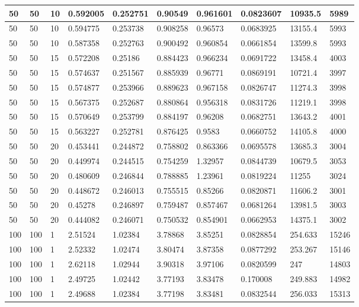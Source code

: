 \begin{landscape}
\begin{longtable}{ | l | l | l | l | l | l | l | l | l | l | }
50 & 50 & 10 & 0.592005 & 0.252751 & 0.90549 & 0.961601 & 0.0823607 & 10935.5 & 5989\\ \hline
50 & 50 & 10 & 0.594775 & 0.253738 & 0.908258 & 0.96573 & 0.0683925 & 13155.4 & 5993\\ \hline
50 & 50 & 10 & 0.587358 & 0.252763 & 0.900492 & 0.960854 & 0.0661854 & 13599.8 & 5993\\ \hline
50 & 50 & 15 & 0.572208 & 0.25186 & 0.884423 & 0.966234 & 0.0691722 & 13458.4 & 4003\\ \hline
50 & 50 & 15 & 0.574637 & 0.251567 & 0.885939 & 0.96771 & 0.0869191 & 10721.4 & 3997\\ \hline
50 & 50 & 15 & 0.574877 & 0.253966 & 0.889623 & 0.967158 & 0.0826747 & 11274.3 & 3998\\ \hline
50 & 50 & 15 & 0.567375 & 0.252687 & 0.880864 & 0.956318 & 0.0831726 & 11219.1 & 3998\\ \hline
50 & 50 & 15 & 0.570649 & 0.253799 & 0.884197 & 0.96208 & 0.0682751 & 13643.2 & 4001\\ \hline
50 & 50 & 15 & 0.563227 & 0.252781 & 0.876425 & 0.9583 & 0.0660752 & 14105.8 & 4000\\ \hline
50 & 50 & 20 & 0.453441 & 0.244872 & 0.758802 & 0.863366 & 0.0695578 & 13685.3 & 3004\\ \hline
50 & 50 & 20 & 0.449974 & 0.244515 & 0.754259 & 1.32957 & 0.0844739 & 10679.5 & 3053\\ \hline
50 & 50 & 20 & 0.480609 & 0.246844 & 0.788885 & 1.23961 & 0.0819224 & 11255 & 3024\\ \hline
50 & 50 & 20 & 0.448672 & 0.246013 & 0.755515 & 0.85266 & 0.0820871 & 11606.2 & 3001\\ \hline
50 & 50 & 20 & 0.45278 & 0.246897 & 0.759487 & 0.857467 & 0.0681264 & 13981.5 & 3003\\ \hline
50 & 50 & 20 & 0.444082 & 0.246071 & 0.750532 & 0.854901 & 0.0662953 & 14375.1 & 3002\\ \hline
100 & 100 & 1 & 2.51524 & 1.02384 & 3.78868 & 3.85251 & 0.0828854 & 254.633 & 15246\\ \hline
100 & 100 & 1 & 2.52332 & 1.02474 & 3.80474 & 3.87358 & 0.0877292 & 253.267 & 15146\\ \hline
100 & 100 & 1 & 2.62118 & 1.02944 & 3.90318 & 3.97106 & 0.0820599 & 247 & 14803\\ \hline
100 & 100 & 1 & 2.49725 & 1.02442 & 3.77193 & 3.83478 & 0.170008 & 249.883 & 14982\\ \hline
100 & 100 & 1 & 2.49688 & 1.02384 & 3.77198 & 3.83481 & 0.0832544 & 256.033 & 15313\\ \hline

\end{longtable}
\end{landscape}
